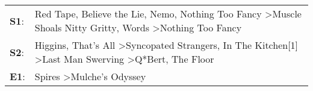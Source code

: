 \begin{supertabular}{p{0.03\textwidth}p{0.92\textwidth}}
 \textbf{S1}:  &        Red Tape\textsuperscript{}, \enspace Believe the Lie\textsuperscript{}, \enspace Nemo\textsuperscript{}, \enspace Nothing Too Fancy\textsuperscript{} \textgreater \enspace Muscle Shoals Nitty Gritty\textsuperscript{}, \enspace Words\textsuperscript{} \textgreater \enspace Nothing Too Fancy\textsuperscript{}  \enspace  \\
 \textbf{S2}:  &  Higgins\textsuperscript{}, \enspace That's All\textsuperscript{} \textgreater \enspace Syncopated Strangers\textsuperscript{}, \enspace In The Kitchen[1]\textsuperscript{} \textgreater \enspace Last Man Swerving\textsuperscript{} \textgreater \enspace Q*Bert\textsuperscript{}, \enspace The Floor\textsuperscript{}  \enspace  \\
 \textbf{E1}:  &                                                                                                                                                                                                                                           Spires\textsuperscript{} \textgreater \enspace Mulche's Odyssey\textsuperscript{}  \enspace  \\
\end{supertabular}
